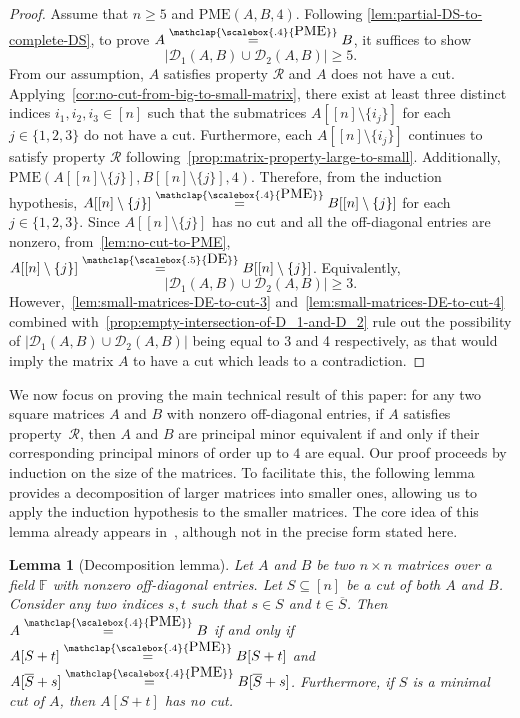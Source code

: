 \documentclass[11pt,letterpaper]{article}
\newcommand{\comp}[1]{\overline{#1}}
\newcommand{\F}{\mathbb{F}}
\newtheorem{lemma}{Lemma}[section]
\newcommand{\DE}{\stackrel{\mathclap{\scalebox{.5}{\mbox{DE}}}}{=}}
\newcommand{\PME}{\stackrel{\mathclap{\scalebox{.4}{\mbox{PME}}}}{=}}
\newcommand{\kPME}[3]{\mathrm{PME}(#1, #2, #3)}
\newcommand{\nsubset}[1]{[n]\setminus\{#1\}}
\newcommand{\calD}{\mathcal{D}}
\newcommand{\prop}{\mathcal{R}}
\begin{document}
{{{\begin{proof}
Assume that $n \ge 5$ and $\kPME{A}{B}{4}$. Following \cref{lem:partial-DS-to-complete-DS}, to prove $A\PME B$, it suffices to show 
\[
|\calD_1(A,B)\cup\calD_2(A,B)|\geq 5.
\]
%
From our assumption, $A$ satisfies property $\prop$ and $A$ does not have a cut. Applying~\cref{cor:no-cut-from-big-to-small-matrix}, there exist at least three distinct indices $i_1, i_2, i_3\in[n]$ such that the submatrices $A[\nsubset{i_j}]$ for each $j \in \{1,2,3\}$ do not have a cut. 
%
Furthermore, each $A[\nsubset{i_j}]$ continues to satisfy property $\prop$ following~\cref{prop:matrix-property-large-to-small}. Additionally, $\kPME{A[\nsubset{j}]}{B[\nsubset{j}]}{4}$. Therefore, from the induction hypothesis, $A[\nsubset{j}]\PME B[\nsubset{j}]$ for each $j\in \{1,2,3\}$. 
%
Since $A[\nsubset{j}]$ has no cut and all the off-diagonal entries are nonzero, from~\cref{lem:no-cut-to-PME}, $A[\nsubset{j}]\DE B[\nsubset{j}]$.
Equivalently,
\[
|\calD_1(A,B)\cup\calD_2(A,B)|\geq 3.
\]
%
However,~\cref{lem:small-matrices-DE-to-cut-3} and~\cref{lem:small-matrices-DE-to-cut-4} combined with~\cref{prop:empty-intersection-of-D_1-and-D_2} rule out the possibility of $|\calD_1(A,B)\cup\calD_2(A,B)|$ being equal to 3 and 4 respectively, as that would imply the matrix $A$ to have a cut which leads to a contradiction. 
\end{proof}

We now focus on proving the main technical result of this paper: for any two square matrices $A$ and $B$ with nonzero off-diagonal entries, if $A$ satisfies property~$\prop$, then $A$ and $B$ are principal minor equivalent if and only if their corresponding principal minors of order up to $4$ are equal. Our proof proceeds by induction on the size of the matrices. To facilitate this, the following lemma provides a decomposition of larger matrices into smaller ones, allowing us to apply the induction hypothesis to the smaller matrices. The core idea of this lemma already appears in~\cite{Chatterjee25}, although not in the precise form stated here.

\begin{lemma}[Decomposition lemma]
\label{lem:cut-decomposition}
Let $A$ and $B$ be two $n\times n$ matrices over a field $\F$ with nonzero off-diagonal entries. Let $S\subseteq [n]$ be a cut of both $A$ and $B$. Consider any two indices $s,t$ such that $s\in S$ and $t\in \comp{S}$. Then $A \PME B$ if and only if $A[S+t] \PME B[S+t]$ and $A[\comp{S} + s] \PME B[\comp{S} + s]$. Furthermore, if $S$ is a minimal cut of $A$, then $A[S+t]$ has no cut.
\end{lemma}

}}}
\end{document}
